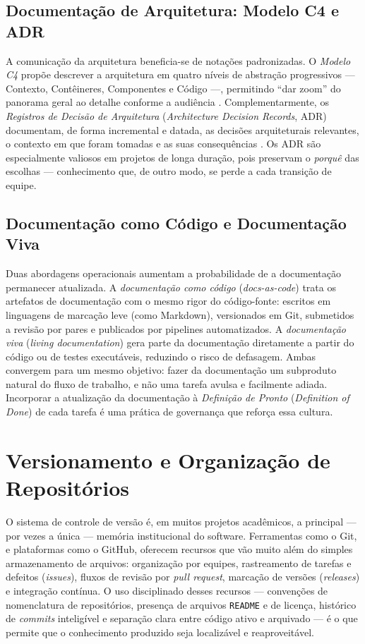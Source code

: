 \subsection{Documentação de Arquitetura: Modelo C4 e ADR}

A comunicação da arquitetura beneficia-se de notações padronizadas. O \emph{Modelo C4}
propõe descrever a arquitetura em quatro níveis de abstração progressivos --- Contexto,
Contêineres, Componentes e Código ---, permitindo ``dar zoom'' do panorama geral ao detalhe
conforme a audiência \cite{c4model}. Complementarmente, os \emph{Registros de Decisão de
Arquitetura} (\emph{Architecture Decision Records}, ADR) documentam, de forma incremental e
datada, as decisões arquiteturais relevantes, o contexto em que foram tomadas e as suas
consequências \cite{adr}. Os ADR são especialmente valiosos em projetos de longa duração,
pois preservam o \emph{porquê} das escolhas --- conhecimento que, de outro modo, se perde a
cada transição de equipe.

\subsection{Documentação como Código e Documentação Viva}

Duas abordagens operacionais aumentam a probabilidade de a documentação permanecer
atualizada. A \emph{documentação como código} (\emph{docs-as-code}) trata os artefatos de
documentação com o mesmo rigor do código-fonte: escritos em linguagens de marcação leve
(como Markdown), versionados em Git, submetidos a revisão por pares e publicados por
pipelines automatizados. A \emph{documentação viva} (\emph{living documentation}) gera parte
da documentação diretamente a partir do código ou de testes executáveis, reduzindo o risco
de defasagem. Ambas convergem para um mesmo objetivo: fazer da documentação um subproduto
natural do fluxo de trabalho, e não uma tarefa avulsa e facilmente adiada. Incorporar a
atualização da documentação à \emph{Definição de Pronto} (\emph{Definition of Done}) de
cada tarefa é uma prática de governança que reforça essa cultura.

\section{Versionamento e Organização de Repositórios}
\label{sec:versionamento}

O sistema de controle de versão é, em muitos projetos acadêmicos, a principal --- por vezes
a única --- memória institucional do software. Ferramentas como o Git, e plataformas como o
GitHub, oferecem recursos que vão muito além do simples armazenamento de arquivos:
organização por equipes, rastreamento de tarefas e defeitos (\emph{issues}), fluxos de
revisão por \emph{pull request}, marcação de versões (\emph{releases}) e integração
contínua. O uso disciplinado desses recursos --- convenções de nomenclatura de
repositórios, presença de arquivos \texttt{README} e de licença, histórico de \emph{commits}
inteligível e separação clara entre código ativo e arquivado --- é o que permite que o
conhecimento produzido seja localizável e reaproveitável.

